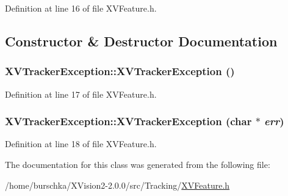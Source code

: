 Definition at line 16 of file XVFeature.h.

\subsection{Constructor \& Destructor Documentation}
\label{XVTrackerException_a0}
\hypertarget{class_XVTrackerException_a0}{
\subsubsection[XVTrackerException]{\setlength{\rightskip}{0pt plus 5cm}XVTracker\-Exception::XVTracker\-Exception ()}}




Definition at line 17 of file XVFeature.h.\label{XVTrackerException_a1}
\hypertarget{class_XVTrackerException_a1}{
\subsubsection[XVTrackerException]{\setlength{\rightskip}{0pt plus 5cm}XVTracker\-Exception::XVTracker\-Exception (char $\ast$ {\em err})}}




Definition at line 18 of file XVFeature.h.

The documentation for this class was generated from the following file:\begin{CompactItemize}
\item 
/home/burschka/XVision2-2.0.0/src/Tracking/\hyperlink{XVFeature.h-source}{XVFeature.h}\end{CompactItemize}
